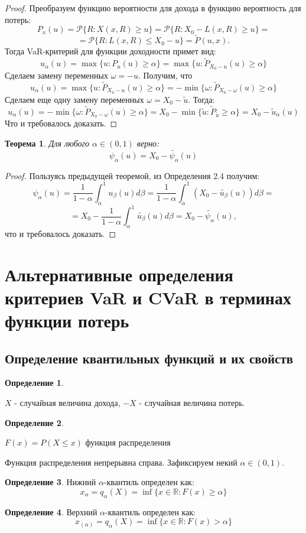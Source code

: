 \documentclass[14pt,a4paper]{article}
\theoremstyle{plain}
\newtheorem{Th}{Теорема}[section]
\theoremstyle{definition}
\newtheorem{Def}{Определение}[section]
\begin{document}
\begin{proof}
Преобразуем функцию вероятности для дохода в функцию вероятность для потерь:
$$
P_x(u) =  \mathcal{P}\{R:X(x,R) \ge u\} =\mathcal{P}\{R:X_0 - L(x,R) \ge u \} =
$$
$$
= \mathcal{P}\{R:L(x,R) \le X_0 - u\} = \tilde{P}(u,x) .
$$
Тогда VaR-критерий для функции доходности примет вид:
$$
u_\alpha(u) = \max\{u:P_u(u)\ge \alpha  \} = \max\{u:\tilde{P}_{X_0-u}(u) \ge \alpha \}
$$
Сделаем замену переменных $\omega = - u$.
Получим, что
$$
u_\alpha(u) = \max\{u:\tilde{P}_{X_0-u}(u) \ge \alpha \} = - \min\{\omega:\tilde{P}_{X_0-\omega}(u) \ge \alpha  \}
$$
Сделаем еще одну замену переменных $\omega = X_0 - \tilde{u}$.
Тогда:
$$
u_\alpha(u) = - \min\{\omega:\tilde{P}_{X_0-\omega}(u) \ge \alpha  \} = X_0 - \min\{\tilde{u}:\tilde{P}_{\tilde{u}}\ge \alpha\} = X_0 - \tilde{u}_\alpha(u)
$$
Что и требовалось доказать.
\end{proof}

\begin{Th} \label{main} Для любого $\alpha \in (0,1)$ верно:
$$
\psi_\alpha(u) = X_0 - \tilde{\psi_\alpha}(u)
$$
\end{Th}

\begin{proof}
Пользуясь предыдущей теоремой, из Определения 2.4 получим:
$$
\psi_\alpha(u) =\frac{1}{1-\alpha}\int_\alpha^1 u_\beta(u)d\beta =\frac{1}{1-\alpha}\int_\alpha^1(X_0- \tilde{u_\beta}(u))d\beta=
$$
$$
=X_0 - \frac{1}{1-\alpha}\int_\alpha^1\tilde{u_\beta}(u)d\beta=X_0 - \tilde{\psi_\alpha}(u),
$$
что и требовалось доказать.
\end{proof}


 \section{Альтернативные определения критериев VaR и CVaR в терминах функции потерь}

 \subsection{Определение квантильных функций и их свойств}



\begin{Def} \label{main}

$X$ - случайная величина дохода, $-X$ - случайная величина потерь.
\end{Def}


\begin{Def} \label{main}

$F(x) = P(X \le x) $ функция распределения
\end{Def}
Функция распределения непрерывна справа.
Зафиксируем некий $\alpha \in (0,1)$.
\begin{Def} \label{main}
Нижний $\alpha$-квантиль определен как:
$$
x_{\alpha} = q_\alpha(X) = \inf\{x\in \mathbb{R} :F(x) \ge \alpha\}
$$
\end{Def}
\begin{Def} \label{main}
Верхний $\alpha$-квантиль определен как:
$$
x_{(\alpha)} = q_\alpha(X) = \inf\{x\in \mathbb{R} :F(x) > \alpha\}
$$
\end{Def}
\end{document}
